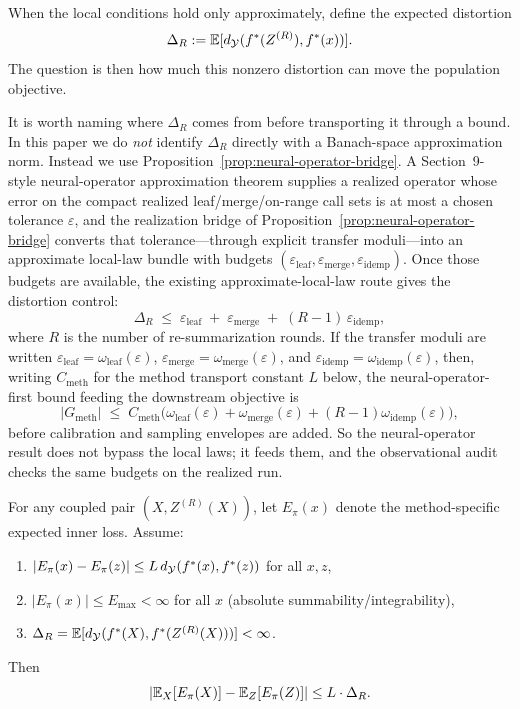 When the local conditions hold only approximately, define the expected distortion
\[
\Delta_R := \mathbb{E}[d_{\mathcal{Y}}(f^\ast(Z^{(R)}), f^\ast(x))].
\]
The question is then how much this nonzero distortion can move the population objective.

It is worth naming where $\Delta_R$ comes from before transporting it
through a bound. In this paper we do \emph{not} identify $\Delta_R$
directly with a Banach-space approximation norm. Instead we use
Proposition~\ref{prop:neural-operator-bridge}. A Section~9-style
neural-operator approximation theorem supplies a realized operator whose
error on the compact realized leaf/merge/on-range call sets is at most a
chosen tolerance $\varepsilon$, and the realization bridge of
Proposition~\ref{prop:neural-operator-bridge} converts that
tolerance---through explicit transfer moduli---into an approximate
local-law bundle with budgets
$(\varepsilon_{\mathrm{leaf}}, \varepsilon_{\mathrm{merge}},
\varepsilon_{\mathrm{idemp}})$. Once those budgets are available, the
existing approximate-local-law route gives the distortion control:
\[
\Delta_R \;\le\;
\varepsilon_{\mathrm{leaf}}
\;+\;
\varepsilon_{\mathrm{merge}}
\;+\;
(R-1)\,\varepsilon_{\mathrm{idemp}},
\]
where $R$ is the number of re-summarization rounds. If the transfer
moduli are written
$\varepsilon_{\mathrm{leaf}}=\omega_{\mathrm{leaf}}(\varepsilon)$,
$\varepsilon_{\mathrm{merge}}=\omega_{\mathrm{merge}}(\varepsilon)$, and
$\varepsilon_{\mathrm{idemp}}=\omega_{\mathrm{idemp}}(\varepsilon)$,
then, writing $C_{\mathrm{meth}}$ for the method transport constant $L$
below, the neural-operator-first bound feeding the downstream objective is
\[
|G_{\mathrm{meth}}|
\;\le\;
C_{\mathrm{meth}}\Big(
\omega_{\mathrm{leaf}}(\varepsilon)
+\omega_{\mathrm{merge}}(\varepsilon)
+(R-1)\omega_{\mathrm{idemp}}(\varepsilon)
\Big),
\]
before calibration and sampling envelopes are added. So the
neural-operator result does not bypass the local laws; it feeds them,
and the observational audit checks the same budgets on the realized run.

\begin{theorem}\label{thm:unified-gap}
For any coupled pair $(X, Z^{(R)}(X))$, let $E_\pi(x)$ denote the method-specific expected inner loss. Assume:
\begin{enumerate}[nosep]
\item $|E_\pi(x)-E_\pi(z)| \le L\,d_{\mathcal{Y}}(f^\ast(x),f^\ast(z))$ for all $x,z$,
\item $|E_\pi(x)| \le E_{\max} < \infty$ for all $x$ (absolute summability/integrability),
\item $\Delta_R = \mathbb{E}[d_{\mathcal{Y}}(f^\ast(X),f^\ast(Z^{(R)}(X)))] < \infty$.
\end{enumerate}
Then
\[
\left| \mathbb{E}_X[E_\pi(X)] - \mathbb{E}_Z[E_\pi(Z)] \right| \le L \cdot \Delta_R.
\]
\end{theorem}

